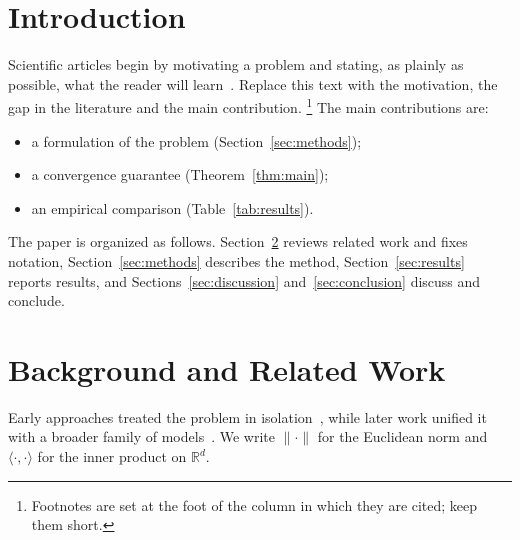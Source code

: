 
\section{Introduction}\label{sec:intro}
Scientific articles begin by motivating a problem and stating, as plainly as
possible, what the reader will learn~\cite{smith2020,lee2021}. Replace this text
with the motivation, the gap in the literature and the main contribution.%
\footnote{Footnotes are set at the foot of the column in which they are cited;
keep them short.} The main contributions are:
\begin{itemize}
  \item a formulation of the problem (Section~\ref{sec:methods});
  \item a convergence guarantee (Theorem~\ref{thm:main});
  \item an empirical comparison (Table~\ref{tab:results}).
\end{itemize}
The paper is organized as follows. Section~\ref{sec:background} reviews related
work and fixes notation, Section~\ref{sec:methods} describes the method,
Section~\ref{sec:results} reports results, and Sections~\ref{sec:discussion}
and~\ref{sec:conclusion} discuss and conclude.

\section{Background and Related Work}\label{sec:background}
Early approaches treated the problem in isolation~\cite{garcia2019}, while later
work unified it with a broader family of models~\cite{lee2021}. We write
$\lVert\cdot\rVert$ for the Euclidean norm and
$\langle\cdot,\cdot\rangle$ for the inner product on $\mathbb{R}^{d}$.

